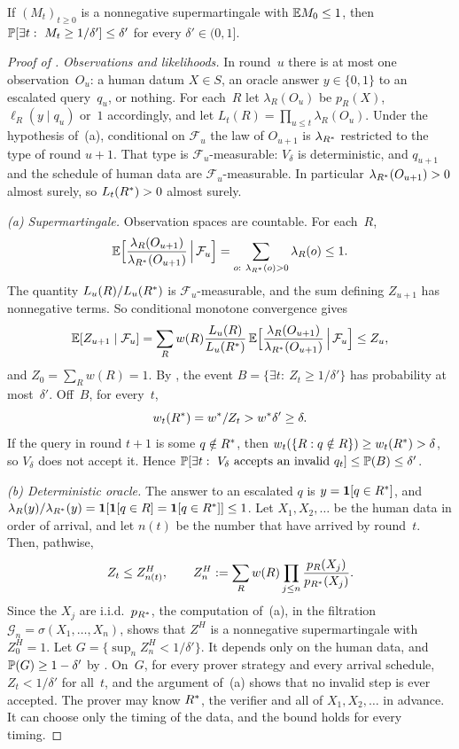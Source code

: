 \begin{lemma}\label{lem:app:caution:ville}
If $(M_t)_{t\ge0}$ is a nonnegative supermartingale with $\mathbb{E} M_0\le1$, then $\Prob[\exists t:\ M_t\ge1/\delta']\le\delta'$ for every $\delta'\in(0,1]$.
\end{lemma}

\begin{proof}[Proof of ]
\emph{Observations and likelihoods.} In round~$u$ there is at most one observation~$O_u$: a human datum $X\in S$, an oracle answer $y\in\{0,1\}$ to an escalated query~$q_u$, or nothing. For each~$R$ let $\lambda_R(O_u)$ be $p_R(X)$, $\ell_R(y\mid q_u)$ or~$1$ accordingly, and let $L_t(R)=\prod_{u\le t}\lambda_R(O_u)$. Under the hypothesis of~(a), conditional on $\mathcal F_u$ the law of $O_{u+1}$ is $\lambda_{R^{*}}$ restricted to the type of round $u+1$. That type is $\mathcal F_u$-measurable: $V_\delta$ is deterministic, and $q_{u+1}$ and the schedule of human data are $\mathcal F_u$-measurable. In particular $\lambda_{R^{*}}(O_{u+1})>0$ almost surely, so $L_t(R^{*})>0$ almost surely.

\emph{(a) Supermartingale.} Observation spaces are countable. For each~$R$,
\[
\mathbb{E}\Big[\frac{\lambda_R(O_{u+1})}{\lambda_{R^{*}}(O_{u+1})}\,\Big|\,\mathcal F_u\Big]=\sum_{o:\ \lambda_{R^{*}}(o)>0}\lambda_R(o)\le1 .
\]
The quantity $L_u(R)/L_u(R^{*})$ is $\mathcal F_u$-measurable, and the sum defining $Z_{u+1}$ has nonnegative terms. So conditional monotone convergence gives
\[
\mathbb{E}[Z_{u+1}\mid\mathcal F_u]=\sum_Rw(R)\frac{L_u(R)}{L_u(R^{*})}\,\mathbb{E}\Big[\frac{\lambda_R(O_{u+1})}{\lambda_{R^{*}}(O_{u+1})}\,\Big|\,\mathcal F_u\Big]\le Z_u ,
\]
and $Z_0=\sum_Rw(R)=1$. By , the event $B=\{\exists t:\ Z_t\ge1/\delta'\}$ has probability at most~$\delta'$. Off~$B$, for every~$t$,
\[
w_t(R^{*})=w^{*}/Z_t>w^{*}\delta'\ge\delta .
\]
If the query in round $t+1$ is some $q\notin R^{*}$, then $w_t(\{R:q\notin R\})\ge w_t(R^{*})>\delta$, so $V_\delta$ does not accept it. Hence $\Prob[\exists t:\ V_\delta\text{ accepts an invalid }q_t]\le\Prob(B)\le\delta'$.

\emph{(b) Deterministic oracle.} The answer to an escalated $q$ is $y=\mathbf 1[q\in R^{*}]$, and $\lambda_R(y)/\lambda_{R^{*}}(y)=\mathbf 1[\mathbf 1[q\in R]=\mathbf 1[q\in R^{*}]]\le1$. Let $X_1,X_2,\dots$ be the human data in order of arrival, and let $n(t)$ be the number that have arrived by round~$t$. Then, pathwise,
\[
Z_t\le Z^H_{n(t)},\qquad Z^H_n:=\sum_Rw(R)\prod_{j\le n}\frac{p_R(X_j)}{p_{R^{*}}(X_j)} .
\]
Since the $X_j$ are i.i.d.\ $p_{R^{*}}$, the computation of~(a), in the filtration $\mathcal G_n=\sigma(X_1,\dots,X_n)$, shows that $Z^H$ is a nonnegative supermartingale with $Z^H_0=1$. Let $G=\{\sup_nZ^H_n<1/\delta'\}$. It depends only on the human data, and $\mathbb{P}(G)\ge1-\delta'$ by . On~$G$, for every prover strategy and every arrival schedule, $Z_t<1/\delta'$ for all~$t$, and the argument of~(a) shows that no invalid step is ever accepted. The prover may know $R^{*}$, the verifier and all of $X_1,X_2,\dots$ in advance. It can choose only the timing of the data, and the bound holds for every timing.
\end{proof}

